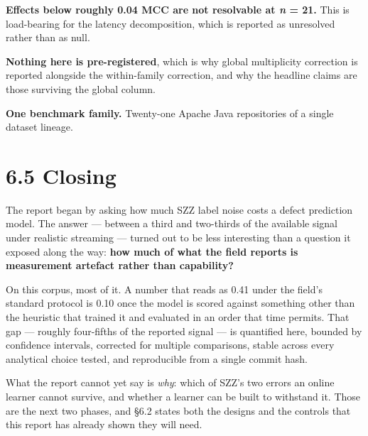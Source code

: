 \textbf{Effects below roughly 0.04 MCC are not resolvable at \emph{n} =
21.} This is load-bearing for the latency decomposition, which is
reported as unresolved rather than as null.

\textbf{Nothing here is pre-registered}, which is why global
multiplicity correction is reported alongside the within-family
correction, and why the headline claims are those surviving the global
column.

\textbf{One benchmark family.} Twenty-one Apache Java repositories of a
single dataset lineage.

\section{6.5 Closing}\label{closing}

The report began by asking how much SZZ label noise costs a defect
prediction model. The answer --- between a third and two-thirds of the
available signal under realistic streaming --- turned out to be less
interesting than a question it exposed along the way: \textbf{how much
of what the field reports is measurement artefact rather than
capability?}

On this corpus, most of it. A number that reads as 0.41 under the
field's standard protocol is 0.10 once the model is scored against
something other than the heuristic that trained it and evaluated in an
order that time permits. That gap --- roughly four-fifths of the
reported signal --- is quantified here, bounded by confidence intervals,
corrected for multiple comparisons, stable across every analytical
choice tested, and reproducible from a single commit hash.

What the report cannot yet say is \emph{why}: which of SZZ's two errors
an online learner cannot survive, and whether a learner can be built to
withstand it. Those are the next two phases, and \S{}6.2 states both the
designs and the controls that this report has already shown they will
need.
